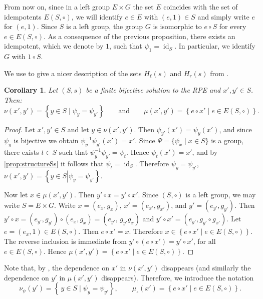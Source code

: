 \documentclass[a4paper,10pt]{amsart}
\newtheorem{corollary}[lemma]{Corollary}
\theoremstyle{definition}
\theoremstyle{remark}
\DeclareMathOperator{\id}{id}
\begin{document}
From now on, since in a left group $E\times G$ the set $E$ coincides with the set of idempotents $E(S,\circ)$, we will identify $e\in E$ with $(e,1)\in S$ and simply write $e$ for $(e,1)$.
Since $S$ is a left group, the group $G$ is isomorphic to $e\circ S$ for every $e \in E(S,\circ)$. As a consequence of the previous proposition, there exists an idempotent, which we denote by $1$, such that $\psi_1=\id_S$. In particular, we identify $G$ with $1\circ S$.

We use  to give a nicer description of the sets $H_{\ell}(s)$ and $H_r(s)$ from .

\begin{corollary}\label{the sets nice via left grp result}
    Let $(S, s)$ be a finite bijective solution to the RPE and $x',y' \in S$. Then:
    $$\nu(x',y')=\left\{y\in S \mid \psi_y=\psi_{y'}\right\} \qquad\text{and}\qquad
    \mu(x',y')=\left\{e\circ x' \mid e\in E(S,\circ)\right\}.$$
\end{corollary}
\begin{proof}
    Let $x',y'\in S$ and let $y\in \nu(x',y')$. Then $\psi_{y'}(x')=\psi_y(x')$, and since $\psi_y$ is bijective we obtain $\psi_y^{-1}\psi_{y'}(x') = x'$. 
    Since $\Psi=\{\psi_x\mid x\in S\}$ is a group, there exists $t\in S$ such that $\psi_y^{-1}\psi_{y'}=\psi_t$. Hence $\psi_t(x')=x'$, and by \cref{prop:structureSs} it follows that $\psi_t=\id_S$. 
    Therefore $\psi_y=\psi_{y'}$, $\nu(x',y') = \left\{ y \in S\left| \psi_y = \psi_{y'}\right.\right\}$.
    
   Now let $x\in \mu(x',y')$. Then $y'\circ x=y'\circ x'$. Since $(S,\circ)$ is a left group, we may write $S=E\times G$. Write $x=(e_x,g_x)$, $x'=(e_{x'},g_{x'})$, and $y'=(e_{y'},g_{y'})$. Then 
    $y'\circ x=(e_{y'},g_{y'})\circ (e_x,g_x)=(e_{y'},\,g_{y'}g_x)$
    and 
    $y'\circ x' = (e_{y'}, g_{y'}\circ g_{x'})$. Let $e=(e_x,1)\in E(S,\circ)$. Then $e\circ x' = x$. Therefore $x \in \left\{e\circ x' \mid e\in E(S,\circ)\right\}$. The reverse inclusion is immediate from
    $y'\circ (e\circ x')=y'\circ x'$, for all $e\in E(S,\circ)$.
    Hence $\mu(x',y') = \left\{e \circ x'\mid e \in E(S,\circ) \right\}$.
\end{proof}

Note that, by , the dependence on $x'$ in $\nu(x',y')$ disappears (and similarly the dependence on $y'$ in $\mu(x',y')$ disappears). Therefore, we introduce the notation
$$
\nu_{\psi}(y') = \left\{\, y\in S \mid \psi_y = \psi_{y'} \right\},
\qquad
\mu_{\circ}(x') = \left \{e \circ x' \mid e \in E(S,\circ) \right\}.
$$
\end{document}
